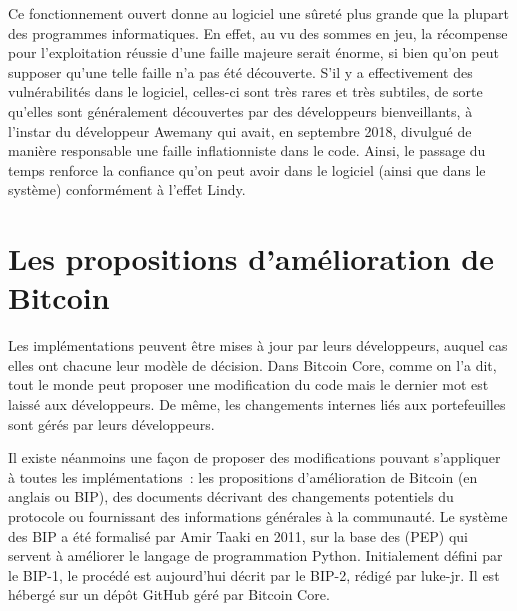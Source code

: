 Ce fonctionnement ouvert donne au logiciel une sûreté plus grande que la plupart des programmes informatiques. En effet, au vu des sommes en jeu, la récompense pour l'exploitation réussie d'une faille majeure serait énorme, si bien qu'on peut supposer qu'une telle faille n'a pas été découverte. S'il y a effectivement des vulnérabilités dans le logiciel, celles-ci sont très rares et très subtiles, de sorte qu'elles sont généralement découvertes par des développeurs bienveillants, à l'instar du développeur Awemany qui avait, en septembre 2018, divulgué de manière responsable une faille inflationniste dans le code. Ainsi, le passage du temps renforce la confiance qu'on peut avoir dans le logiciel (ainsi que dans le système) conformément à l'effet Lindy. %

\section*{Les propositions d'amélioration de Bitcoin}

Les implémentations peuvent être mises à jour par leurs développeurs, auquel cas elles ont chacune leur modèle de décision. Dans Bitcoin Core, comme on l'a dit, tout le monde peut proposer une modification du code mais le dernier mot est laissé aux développeurs. De même, les changements internes liés aux portefeuilles sont gérés par leurs développeurs.

Il existe néanmoins une façon de proposer des modifications pouvant s'appliquer à toutes les implémentations~: les propositions d'amélioration de Bitcoin (en anglais  ou BIP), des documents décrivant des changements potentiels du protocole ou fournissant des informations générales à la communauté. Le système des BIP a été formalisé par Amir Taaki en 2011, sur la base des  (PEP) qui servent à améliorer le langage de programmation Python. Initialement défini par le BIP-1, le procédé est aujourd'hui décrit par le BIP-2, rédigé par luke-jr. Il est hébergé sur un dépôt GitHub géré par Bitcoin Core.

